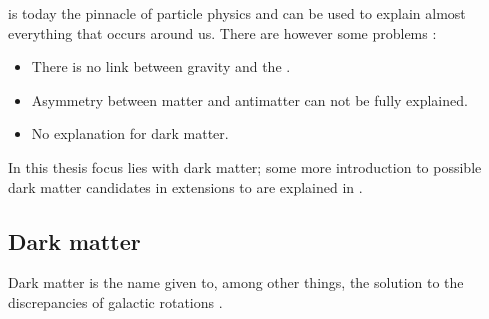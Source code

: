 \abbrSM is today the pinnacle of particle physics and can be used to explain almost everything that occurs around us. There are however some problems \citep{Jungman:1996}:
\begin{itemize}
\item There is no link between gravity and the \abbrSM.
\item Asymmetry between matter and antimatter can not be fully explained.
\item No explanation for dark matter.
\end{itemize} 
In this thesis focus lies with dark matter; some more introduction to possible dark matter candidates in extensions to \abbrSM are explained in .


\subsection{Dark matter}\label{sec:tb:subsec:dark}
Dark matter is the name given to, among other things, the solution to the discrepancies of galactic rotations \citep{darkmatter}.

